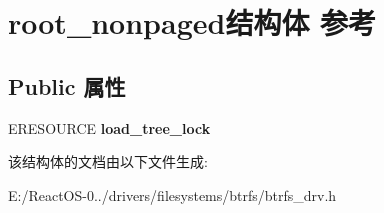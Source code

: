 \hypertarget{structroot__nonpaged}{}\section{root\+\_\+nonpaged结构体 参考}
\label{structroot__nonpaged}
\subsection*{Public 属性}
\begin{DoxyCompactItemize}
\item 
\mbox{\label{structroot__nonpaged_a1ce7e58219fada5f3fd8a1b7082b94b3}} 
E\+R\+E\+S\+O\+U\+R\+CE {\bfseries load\+\_\+tree\+\_\+lock}
\end{DoxyCompactItemize}


该结构体的文档由以下文件生成\+:\begin{DoxyCompactItemize}
\item 
E\+:/\+React\+O\+S-\/0../drivers/filesystems/btrfs/btrfs\+\_\+drv.\+h\end{DoxyCompactItemize}
